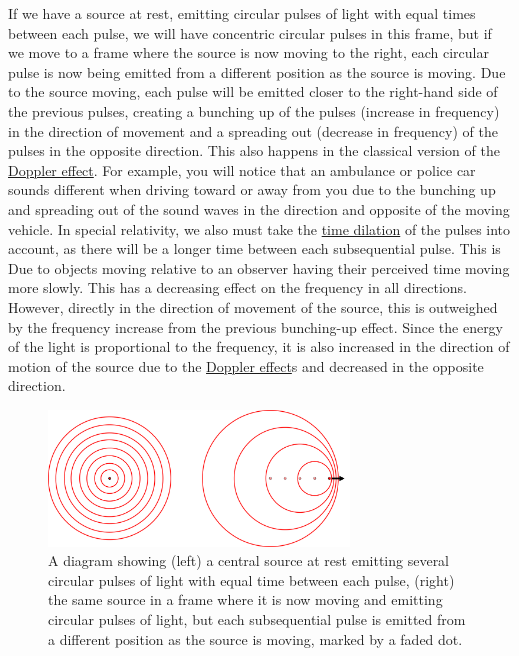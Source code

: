 If we have a source at rest, emitting circular pulses of light with equal times between each pulse, we will have concentric circular pulses in this frame, but if we move to a frame where the source is now moving to the right, each circular pulse is now being emitted from a different position as the source is moving.
Due to the source moving, each pulse will be emitted closer to the right-hand side of the previous pulses, creating a bunching up of the pulses (increase in frequency) in the direction of movement and a spreading out (decrease in frequency) of the pulses in the opposite direction.
This also happens in the classical version of the \hyperlink{def-doppler-effect}{Doppler effect}.
For example, you will notice that an ambulance or police car sounds different when driving toward or away from you due to the bunching up and spreading out of the sound waves in the direction and opposite of the moving vehicle.
In special relativity, we also must take the \hyperlink{def-time-dilation}{time dilation} of the pulses into account, as there will be a longer time between each subsequential pulse.
This is Due to objects moving relative to an observer having their perceived time moving more slowly.
This has a decreasing effect on the frequency in all directions.
However, directly in the direction of movement of the source, this is outweighed by the frequency increase from the previous bunching-up effect.
Since the energy of the light is proportional to the frequency, it is also increased in the direction of motion of the source due to the \hyperlink{def-doppler-effect}{Doppler effect}s and decreased in the opposite direction.

\begin{figure}[H]
	\centering
	\includegraphics[width=8cm]{images/pdf/Doppler.pdf}
	\caption{A diagram showing (left) a central source at rest emitting several circular pulses of light with equal time between each pulse, (right) the same source in a frame where it is now moving and emitting circular pulses of light, but each subsequential pulse is emitted from a different position as the source is moving, marked by a faded dot.}
	\label{fig: doppler effect intro}
\end{figure}

